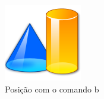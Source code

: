 \documentclass{book}
\newcommand\blankpage{%
    \null
    \thispagestyle{empty}%
    \addtocounter{page}{-1}%
    \newpage}
\begin{document}
	\begin{figure}[p]
	  \centering
	  \includegraphics[scale=2]{formas.png}
	  \caption{Posição com o comando b}
	 \end{figure}
	 \lipsum[3-11]
	 \blankpage

\end{document}
